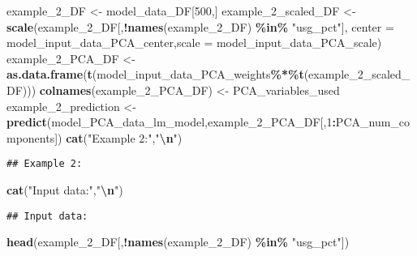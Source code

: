 \documentclass[
]{article}
\newenvironment{Shaded}{\begin{snugshade}}{\end{snugshade}}
\newcommand{\AttributeTok}[1]{\textcolor[rgb]{0.13,0.29,0.53}{#1}}
\newcommand{\DecValTok}[1]{\textcolor[rgb]{0.00,0.00,0.81}{#1}}
\newcommand{\FunctionTok}[1]{\textcolor[rgb]{0.13,0.29,0.53}{\textbf{#1}}}
\newcommand{\NormalTok}[1]{#1}
\newcommand{\OtherTok}[1]{\textcolor[rgb]{0.56,0.35,0.01}{#1}}
\newcommand{\SpecialCharTok}[1]{\textcolor[rgb]{0.81,0.36,0.00}{\textbf{#1}}}
\newcommand{\StringTok}[1]{\textcolor[rgb]{0.31,0.60,0.02}{#1}}
\begin{document}
\begin{Shaded}
\begin{Highlighting}[]
\NormalTok{example\_2\_DF }\OtherTok{\textless{}{-}}\NormalTok{ model\_data\_DF[}\DecValTok{500}\NormalTok{,]}
\NormalTok{example\_2\_scaled\_DF }\OtherTok{\textless{}{-}} \FunctionTok{scale}\NormalTok{(example\_2\_DF[,}\SpecialCharTok{!}\FunctionTok{names}\NormalTok{(example\_2\_DF) }\SpecialCharTok{\%in\%} \StringTok{"usg\_pct"}\NormalTok{],}
            \AttributeTok{center =}\NormalTok{ model\_input\_data\_PCA\_center,}\AttributeTok{scale =}\NormalTok{ model\_input\_data\_PCA\_scale)}
\NormalTok{example\_2\_PCA\_DF }\OtherTok{\textless{}{-}} 
    \FunctionTok{as.data.frame}\NormalTok{(}\FunctionTok{t}\NormalTok{(model\_input\_data\_PCA\_weights}\SpecialCharTok{\%*\%}\FunctionTok{t}\NormalTok{(example\_2\_scaled\_DF)))}
\FunctionTok{colnames}\NormalTok{(example\_2\_PCA\_DF) }\OtherTok{\textless{}{-}}\NormalTok{ PCA\_variables\_used}
\NormalTok{example\_2\_prediction }\OtherTok{\textless{}{-}}
  \FunctionTok{predict}\NormalTok{(model\_PCA\_data\_lm\_model,example\_2\_PCA\_DF[,}\DecValTok{1}\SpecialCharTok{:}\NormalTok{PCA\_num\_components])}
\FunctionTok{cat}\NormalTok{(}\StringTok{"Example 2:"}\NormalTok{,}\StringTok{"}\SpecialCharTok{\textbackslash{}n}\StringTok{"}\NormalTok{)}
\end{Highlighting}
\end{Shaded}

\begin{verbatim}
## Example 2:
\end{verbatim}

\begin{Shaded}
\begin{Highlighting}[]
\FunctionTok{cat}\NormalTok{(}\StringTok{"Input data:"}\NormalTok{,}\StringTok{"}\SpecialCharTok{\textbackslash{}n}\StringTok{"}\NormalTok{)}
\end{Highlighting}
\end{Shaded}

\begin{verbatim}
## Input data:
\end{verbatim}

\begin{Shaded}
\begin{Highlighting}[]
\FunctionTok{head}\NormalTok{(example\_2\_DF[,}\SpecialCharTok{!}\FunctionTok{names}\NormalTok{(example\_2\_DF) }\SpecialCharTok{\%in\%} \StringTok{"usg\_pct"}\NormalTok{])}
\end{Highlighting}
\end{Shaded}
\end{document}
